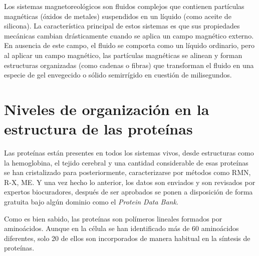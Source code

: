 Los sistemas magnetoreol\'{o}gicos son fluidos complejos que contienen part\'{i}culas magn\'{e}ticas (\'{o}xidos de metales) suspendidos en un l\'{i}quido (como aceite de silicona). La caracter\'{i}stica principal de estos sistemas es que sus propiedades mec\'{a}nicas cambian dr\'{a}sticamente cuando se aplica un campo magn\'{e}tico externo. En ausencia de este campo, el ﬂuido se comporta como un l\'{i}quido ordinario, pero al aplicar un campo magn\'{e}tico, las part\'{i}culas magn\'{e}ticas se alinean y forman estructuras organizadas (como cadenas o ﬁbras) que transforman el ﬂuido en una especie de gel envegecido o s\'{o}lido semirr\'{i}gido en cuesti\'{o}n de milisegundos. 

 
 
 
\section{Niveles de organizaci\'{o}n en la estructura de las prote\'{i}nas}


Las prote\'{i}nas est\'{a}n presentes en todos los sistemas vivos, desde estructuras como la hemoglobina, el tejido cerebral y una cantidad considerable de esas prote\'{i}nas se han cristalizado para
posteriormente, caracterizarse por m\'{e}todos como RMN, R-X, ME. Y una vez hecho lo anterior, los datos son enviados y son revisados por expertos biocuradores, despu\'{e}s de
ser aprobados se ponen a disposici\'{o}n de forma gratuita bajo algún dominio como el \textit{Protein Data Bank}.

Como es bien sabido, las proteínas son polímeros lineales formados por aminoácidos. Aunque en la célula se han identificado más de 60 aminoácidos diferentes, solo 20 de ellos son incorporados de manera habitual en la síntesis de proteínas.

